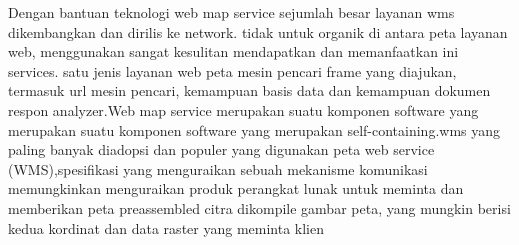 Dengan bantuan teknologi web map service  sejumlah besar layanan wms dikembangkan dan dirilis ke network. tidak untuk organik di antara
peta layanan web, menggunakan sangat kesulitan mendapatkan dan memanfaatkan ini services. satu jenis layanan web peta mesin pencari
frame yang diajukan, termasuk url mesin pencari, kemampuan basis data dan kemampuan dokumen respon analyzer.Web map service merupakan suatu komponen software yang merupakan suatu komponen software yang merupakan self-containing.wms yang paling banyak  diadopsi dan populer yang digunakan peta web service (WMS),spesifikasi yang menguraikan sebuah mekanisme komunikasi memungkinkan menguraikan produk perangkat lunak untuk meminta dan memberikan peta preassembled citra dikompile gambar peta, yang mungkin berisi kedua kordinat dan data raster yang meminta klien




  
  
